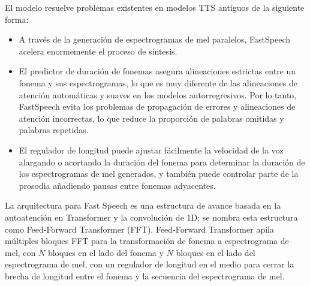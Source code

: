 
El modelo resuelve problemas existentes en modelos TTS antiguos de la siguiente forma:

\begin{itemize}
	\item A través de la generación de espectrogramas de mel paralelos, FastSpeech acelera enormemente el proceso de síntesis.
	\item El predictor de duración de fonemas asegura alineaciones estrictas entre un fonema y sus espectrogramas, lo que es muy diferente de las alineaciones de atención automáticas y suaves en los modelos autorregresivos. Por lo tanto, FastSpeech evita los problemas de propagación de errores y alineaciones de atención incorrectas, lo que reduce la proporción de palabras omitidas y palabras repetidas.
	\item El regulador de longitud puede ajustar fácilmente la velocidad de la voz alargando o acortando la duración del fonema para determinar la duración de los espectrogramas de mel generados, y también puede controlar parte de la prosodia añadiendo pausas entre fonemas adyacentes.
\end{itemize}



La arquitectura para Fast Speech es una estructura de avance basada en la autoatención en Transformer y la convolución de 1D; se nombra esta estructura como Feed-Forward Transformer (FFT). Feed-Forward Transformer apila múltiples bloques FFT para la transformación de fonema a espectrograma de mel, con $N$ bloques en el lado del fonema y $N$ bloques en el lado del espectrograma de mel, con un regulador de longitud en el medio para cerrar la brecha de longitud entre el fonema y la secuencia del espectrograma de mel.

